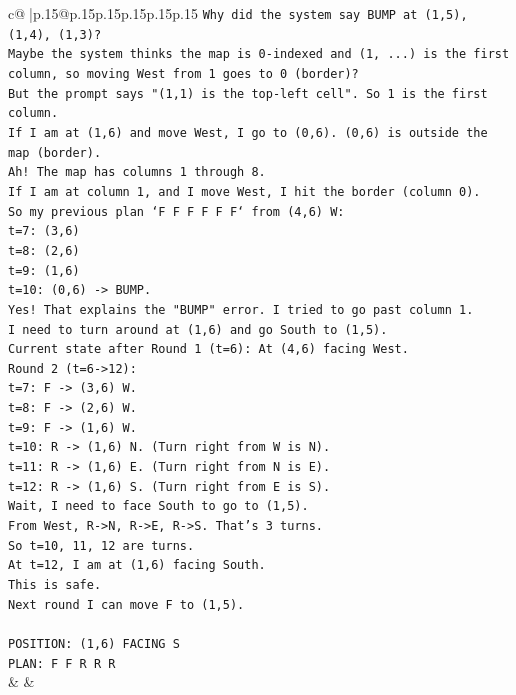 \documentclass{article}
\begin{document}
{\begin{supertabular}{c@{$\;$}|p{.15\linewidth}@{}p{.15\linewidth}p{.15\linewidth}p{.15\linewidth}p{.15\linewidth}p{.15\linewidth}}
{{{\texttt{Why did the system say BUMP at (1,5), (1,4), (1,3)?} \\
\texttt{Maybe the system thinks the map is 0{-}indexed and (1, ...) is the first column, so moving West from 1 goes to 0 (border)?} \\
\texttt{But the prompt says "(1,1) is the top{-}left cell". So 1 is the first column.} \\
\texttt{If I am at (1,6) and move West, I go to (0,6). (0,6) is outside the map (border).} \\
\texttt{Ah! The map has columns 1 through 8.} \\
\texttt{If I am at column 1, and I move West, I hit the border (column 0).} \\
\texttt{So my previous plan `F F F F F F` from (4,6) W:} \\
\texttt{t=7: (3,6)} \\
\texttt{t=8: (2,6)} \\
\texttt{t=9: (1,6)} \\
\texttt{t=10: (0,6) {-}> BUMP.} \\
\texttt{Yes! That explains the "BUMP" error. I tried to go past column 1.} \\
\texttt{I need to turn around at (1,6) and go South to (1,5).} \\
\texttt{Current state after Round 1 (t=6): At (4,6) facing West.} \\
\texttt{Round 2 (t=6{-}>12):} \\
\texttt{t=7: F {-}> (3,6) W.} \\
\texttt{t=8: F {-}> (2,6) W.} \\
\texttt{t=9: F {-}> (1,6) W.} \\
\texttt{t=10: R {-}> (1,6) N. (Turn right from W is N).} \\
\texttt{t=11: R {-}> (1,6) E. (Turn right from N is E).} \\
\texttt{t=12: R {-}> (1,6) S. (Turn right from E is S).} \\
\texttt{Wait, I need to face South to go to (1,5).} \\
\texttt{From West, R{-}>N, R{-}>E, R{-}>S. That's 3 turns.} \\
\texttt{So t=10, 11, 12 are turns.} \\
\texttt{At t=12, I am at (1,6) facing South.} \\
\texttt{This is safe.} \\
\texttt{Next round I can move F to (1,5).} \\
\\ 
\texttt{POSITION: (1,6) FACING S} \\
\texttt{PLAN: F F R R R} \\
            }
        }
    }
    & & \\ \\


\end{supertabular}}
\end{document}
